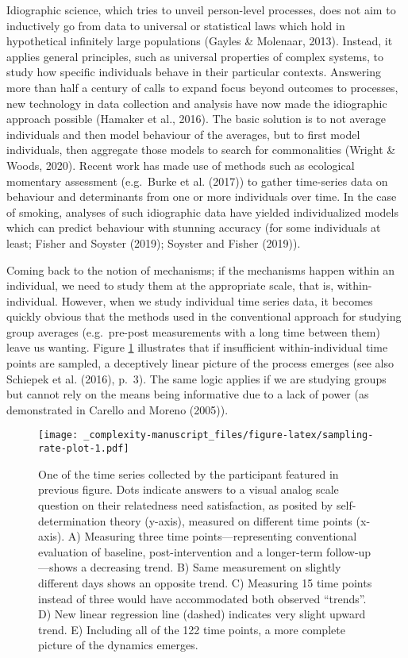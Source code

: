 \documentclass[
  british,
  man,floatsintext]{apa6}
\begin{document}
Idiographic science, which tries to unveil person-level processes, does not aim to inductively go from data to universal or statistical laws which hold in hypothetical infinitely large populations (Gayles \& Molenaar, 2013). Instead, it applies general principles, such as universal properties of complex systems, to study how specific individuals behave in their particular contexts. Answering more than half a century of calls to expand focus beyond outcomes to processes, new technology in data collection and analysis have now made the idiographic approach possible (Hamaker et al., 2016). The basic solution is to not average individuals and then model behaviour of the averages, but to first model individuals, then aggregate those models to search for commonalities (Wright \& Woods, 2020). Recent work has made use of methods such as ecological momentary assessment (e.g.~Burke et al. (2017)) to gather time-series data on behaviour and determinants from one or more individuals over time. In the case of smoking, analyses of such idiographic data have yielded individualized models which can predict behaviour with stunning accuracy (for some individuals at least; Fisher and Soyster (2019); Soyster and Fisher (2019)).

Coming back to the notion of mechanisms; if the mechanisms happen within an individual, we need to study them at the appropriate scale, that is, within-individual. However, when we study individual time series data, it becomes quickly obvious that the methods used in the conventional approach for studying group averages (e.g.~pre-post measurements with a long time between them) leave us wanting. Figure \ref{fig:sampling-rate-plot} illustrates that if insufficient within-individual time points are sampled, a deceptively linear picture of the process emerges (see also Schiepek et al. (2016), p.~3). The same logic applies if we are studying groups but cannot rely on the means being informative due to a lack of power (as demonstrated in Carello and Moreno (2005)).

\begin{figure}
\centering
\texttt{[image: \_complexity-manuscript\_files/figure-latex/sampling-rate-plot-1.pdf]}
\caption{\label{fig:sampling-rate-plot}One of the time series collected by the participant featured in previous figure. Dots indicate answers to a visual analog scale question on their relatedness need satisfaction, as posited by self-determination theory (y-axis), measured on different time points (x-axis). A) Measuring three time points---representing conventional evaluation of baseline, post-intervention and a longer-term follow-up---shows a decreasing trend. B) Same measurement on slightly different days shows an opposite trend. C) Measuring 15 time points instead of three would have accommodated both observed \enquote{trends}. D) New linear regression line (dashed) indicates very slight upward trend. E) Including all of the 122 time points, a more complete picture of the dynamics emerges.}
\end{figure}
\end{document}
